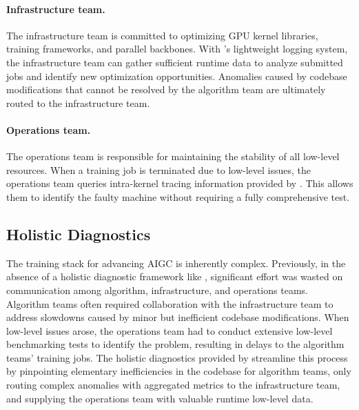 \paragraph{Infrastructure team.}
The infrastructure team is committed to optimizing GPU kernel libraries, training frameworks, and parallel backbones. With \sysname{}’s lightweight logging system, the infrastructure team can gather sufficient runtime data to analyze submitted jobs and identify new optimization opportunities. Anomalies caused by codebase modifications that cannot be resolved by the algorithm team are ultimately routed to the infrastructure team.
\paragraph{Operations team.}
The operations team is responsible for maintaining the stability of all low-level resources. When a training job is terminated due to low-level issues, the operations team queries intra-kernel tracing information provided by \sysname{}. This allows them to identify the faulty machine without requiring a fully comprehensive test.

\subsection{Holistic Diagnostics}
The training stack for advancing AIGC is inherently complex. Previously, in the absence of a holistic diagnostic framework like \sysname{}, significant effort was wasted on communication among algorithm, infrastructure, and operations teams. Algorithm teams often required collaboration with the infrastructure team to address slowdowns caused by minor but inefficient codebase modifications. When low-level issues arose, the operations team had to conduct extensive low-level benchmarking tests to identify the problem, resulting in delays to the algorithm teams’ training jobs. The holistic diagnostics provided by \sysname{} streamline this process by pinpointing elementary inefficiencies in the codebase for algorithm teams, only routing complex anomalies with aggregated metrics to the infrastructure team, and supplying the operations team with valuable runtime low-level data.


